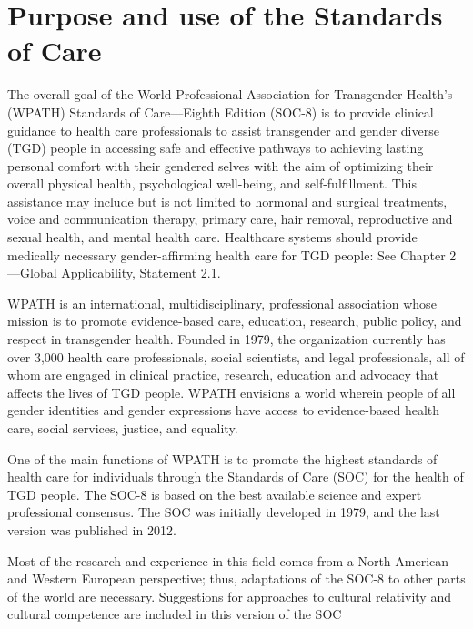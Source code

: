 \documentclass[
]{book}
\begin{document}
\hypertarget{purpose-and-use-of-the-standards-of-care}{%
\section*{Purpose and use of the Standards of Care}\label{purpose-and-use-of-the-standards-of-care}}

The overall goal of the World Professional
Association for Transgender Health's (WPATH)
Standards of Care---Eighth Edition (SOC-8) is to
provide clinical guidance to health care professionals to assist transgender and gender diverse
(TGD) people in accessing safe and effective
pathways to achieving lasting personal comfort
with their gendered selves with the aim of optimizing their overall physical health, psychological
well-being, and self-fulfillment. This assistance
may include but is not limited to hormonal and
surgical treatments, voice and communication
therapy, primary care, hair removal, reproductive
and sexual health, and mental health care.
Healthcare systems should provide medically necessary gender-affirming health care for TGD
people: See Chapter 2---Global Applicability,
Statement 2.1.

WPATH is an international, multidisciplinary,
professional association whose mission is to promote evidence-based care, education, research,
public policy, and respect in transgender health.
Founded in 1979, the organization currently has
over 3,000 health care professionals, social scientists, and legal professionals, all of whom are
engaged in clinical practice, research, education
and advocacy that affects the lives of TGD people. WPATH envisions a world wherein people
of all gender identities and gender expressions
have access to evidence-based health care, social
services, justice, and equality.

One of the main functions of WPATH is to
promote the highest standards of health care for
individuals through the Standards of Care (SOC)
for the health of TGD people. The SOC-8 is
based on the best available science and expert
professional consensus. The SOC was initially
developed in 1979, and the last version was published in 2012.

Most of the research and experience in this
field comes from a North American and Western
European perspective; thus, adaptations of the
SOC-8 to other parts of the world are necessary.
Suggestions for approaches to cultural relativity
and cultural competence are included in this version of the SOC
\end{document}
